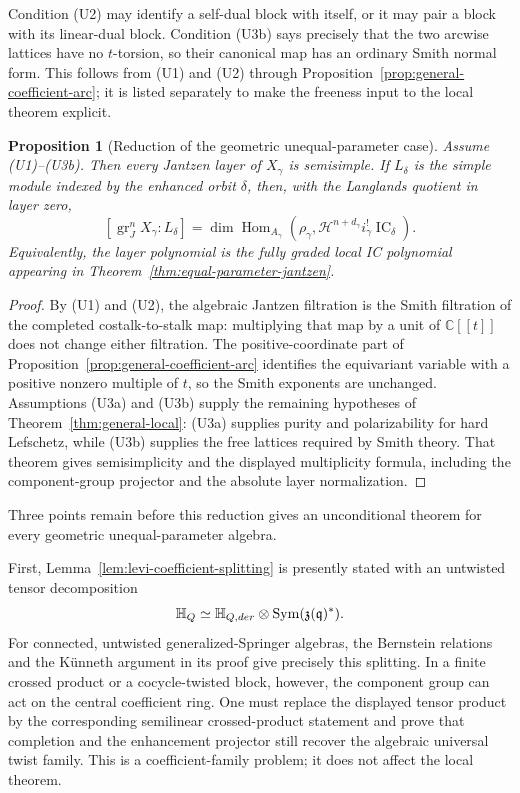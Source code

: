 \documentclass[10pt,a4paper]{amsart}
\newtheorem{proposition}[theorem]{Proposition}
\newcommand{\Hh}{\mathbb H}
\newcommand{\IC}{\operatorname{IC}}
\begin{document}
Condition (U2) may identify a self-dual block with itself, or it may pair a
block with its linear-dual block.  Condition (U3b) says precisely that the
two arcwise lattices have no $t$-torsion, so their canonical map has an
ordinary Smith normal form.  This follows from (U1) and (U2) through
Proposition~\ref{prop:general-coefficient-arc}; it is listed separately to
make the freeness input to the local theorem explicit.

\begin{proposition}[Reduction of the geometric unequal-parameter case]
\label{prop:unequal-parameter-reduction}
Assume \textup{(U1)}--\textup{(U3b)}.  Then every Jantzen layer of
$X_\gamma$ is semisimple.  If $L_\delta$ is the
simple module indexed by the enhanced orbit $\delta$, then, with the
Langlands quotient in layer zero,
\[
 [\operatorname{gr}_J^nX_\gamma:L_\delta]
 =\dim\operatorname{Hom}_{A_\gamma}\!\left(
   \rho_\gamma,
   \mathcal H^{n+d_\gamma}i_\gamma^!\IC_\delta
  \right).
\]
Equivalently, the layer polynomial is the fully graded local IC polynomial
appearing in Theorem~\ref{thm:equal-parameter-jantzen}.
\end{proposition}

\begin{proof}
By (U1) and (U2), the algebraic Jantzen filtration is the Smith filtration of
the completed costalk-to-stalk map: multiplying that map by a unit of
$\mathbb C[[t]]$ does not change either filtration.  The positive-coordinate
part of Proposition~\ref{prop:general-coefficient-arc} identifies the
equivariant variable with a positive nonzero multiple of $t$, so the Smith
exponents are unchanged.  Assumptions (U3a) and (U3b) supply the remaining
hypotheses of Theorem~\ref{thm:general-local}: (U3a) supplies purity and polarizability
for hard Lefschetz, while (U3b) supplies the free lattices required by Smith
theory.  That theorem gives semisimplicity and the displayed multiplicity
formula, including the component-group projector and the absolute layer
normalization.
\end{proof}

Three points remain before this reduction gives an unconditional theorem for
every geometric unequal-parameter algebra.

First, Lemma~\ref{lem:levi-coefficient-splitting} is presently stated with
an untwisted tensor decomposition
\[
 \Hh_Q\simeq
 \Hh_{Q,{\rm der}}\otimes
 \operatorname{Sym}(\mathfrak z(\mathfrak q)^*).
\]
For connected, untwisted generalized-Springer algebras, the Bernstein
relations and the K\"unneth argument in its proof give precisely this
splitting.  In a finite crossed product or a cocycle-twisted block, however,
the component group can act on the central coefficient ring.  One must
replace the displayed tensor product by the corresponding semilinear
crossed-product statement and prove that completion and the enhancement
projector still recover the algebraic universal twist family.  This is a
coefficient-family problem; it does not affect the local theorem.
\end{document}
